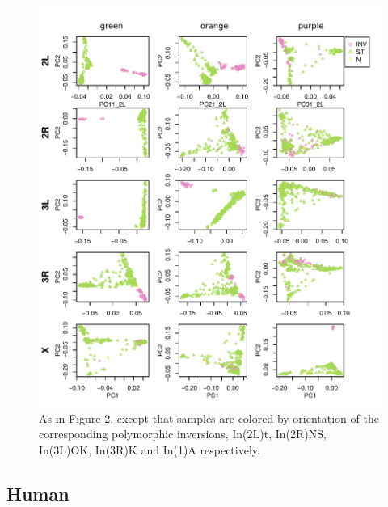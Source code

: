 \documentclass[11pt, oneside]{article}   	%
\begin{document}
\begin{figure}
    \begin{center}
       \includegraphics{Fig3_pca_plots_color_by_inv_allchr_with_ChrX_In1A}
    \end{center}
    \caption{
         As in Figure 2, except that samples are colored by orientation of the corresponding polymorphic inversions, 
         In(2L)t, In(2R)NS, In(3L)OK, In(3R)K and In(1)A respectively. 
         \citep[data from][]{lack2015drosophila}
        \label{fig:pca_by_inversion}
    }
\end{figure}

\subsection{Human}
\end{document}
